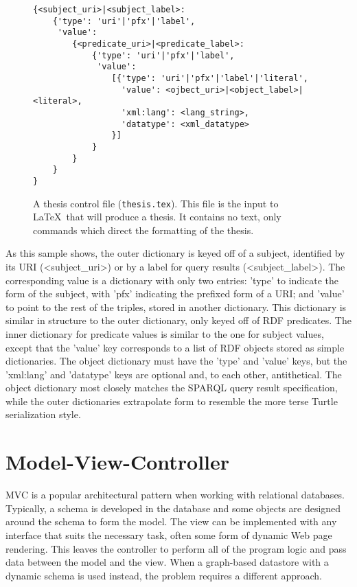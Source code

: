 \begin{figure}[p]
 \begin{fullpage}
  \singlespace
  \begin{verbatim}
{<subject_uri>|<subject_label>:
    {'type': 'uri'|'pfx'|'label',
     'value':
        {<predicate_uri>|<predicate_label>:
            {'type': 'uri'|'pfx'|'label',
             'value':
                [{'type': 'uri'|'pfx'|'label'|'literal',
                  'value': <ojbect_uri>|<object_label>|<literal>,
                  'xml:lang': <lang_string>,
                  'datatype': <xml_datatype>
                }]
            }
        }
    }
}
  \end{verbatim}
  \caption[Structure of a triple in SKMF]
   {\narrower A thesis control file ({\tt thesis.tex}).
   This file is the input to \LaTeX\ that will produce a
   thesis.  It contains no text, only commands which
   direct the formatting of the thesis.
   }
  \label{skmf-triple}
 \end{fullpage}
\end{figure}

As this sample shows, the outer dictionary is keyed off of a subject, identified by its URI (\textless subject\_uri\textgreater ) or by a label for query results (\textless subject\_label\textgreater). The corresponding value is a dictionary with only two entries: 'type' to indicate the form of the subject, with 'pfx' indicating the prefixed form of a URI; and 'value' to point to the rest of the triples, stored in another dictionary. This dictionary is similar in structure to the outer dictionary, only keyed off of RDF predicates. The inner dictionary for predicate values is similar to the one for subject values, except that the 'value' key corresponds to a list of RDF objects stored as simple dictionaries. The object dictionary must have the 'type' and 'value' keys, but the 'xml:lang' and 'datatype' keys are optional and, to each other, antithetical. The object dictionary most closely matches the SPARQL query result specification, while the outer dictionaries extrapolate form to resemble the more terse Turtle serialization style.


\section{Model-View-Controller}

MVC is a popular architectural pattern when working with relational databases. Typically, a schema is developed in the database and some objects are designed around the schema to form the model. The view can be implemented with any interface that suits the necessary task, often some form of dynamic Web page rendering. This leaves the controller to perform all of the program logic and pass data between the model and the view. When a graph-based datastore with a dynamic schema is used instead, the problem requires a different approach. 



